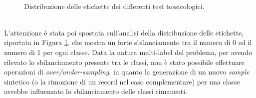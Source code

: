 \begin{figure}[!ht]
	\quad
	\\
	\quad
	\quad	{}\quad
	\caption{Distribuzione delle etichette dei differenti test tossicologici.}
	\label{fig:class_distribution}
\end{figure}
\\L'attenzione è stata poi spostata sull'analisi della distribuzione delle etichette, riportata in Figura \ref{fig:class_distribution}, che mostra un forte sbilanciamento tra il numero di 0 ed il numero di 1 per ogni classe. 
Data la natura multi-label del problema, per avendo rilevato lo sbilanciamento presente tra le classi, non è stato possibile effettuare operazioni di \textit{over/under-sampling}, in quanto la generazione di un nuovo \textit{sample} sintetico (o la rimozione di un record nel caso complementare) per una classe avrebbe influenzato lo sbilanciamento delle classi rimanenti.
